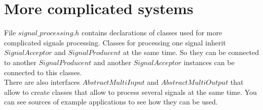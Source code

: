 \documentclass[a4paper]{article}
\begin{document}
\section{More complicated systems}
File $signal\_processing.h$ contains declarations of classes used for more complicated signals processing.
Classes for processing one signal inherit $SignalAcceptor$ and $SignalProducent$ at the same time.
So they can be connected to another $SignalProducent$ and another $SignalAcceptor$ instances can be connected to this classes.\\
There are also interfaces $AbstractMultiInput$ and $AbstractMultiOutput$ that allow to create classes that allow to process several signals at the same time. You can see sources of example applications to see how they can be used.
\end{document}
